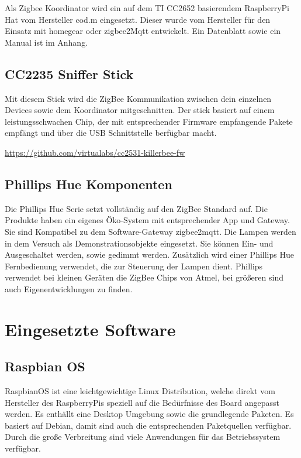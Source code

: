 Als Zigbee Koordinator wird ein auf dem TI CC2652 basierendem RaspberryPi Hat vom Hersteller \grqq cod.m \grqq{} eingesetzt. Dieser wurde vom Hersteller
für den Einsatz mit \grqq homegear \grqq{} oder \grqq zigbee2Mqtt \grqq{} entwickelt. Ein Datenblatt sowie ein Manual ist im Anhang.

\subsection{CC2235 Sniffer Stick}

Mit diesem Stick wird die ZigBee Kommunikation zwischen dein einzelnen Devices sowie dem Koordinator mitgeschnitten.
Der stick basiert auf einem leistungsschwachen Chip, der mit entsprechender Firmware empfangende Pakete empfängt und über die USB Schnittstelle
berfügbar macht. 

\url{https://github.com/virtualabs/cc2531-killerbee-fw}

\subsection{Phillips Hue Komponenten}

Die Phillips Hue Serie setzt vollständig auf den ZigBee Standard auf. Die Produkte haben ein eigenes Öko-System mit entsprechender App und Gateway. Sie sind Kompatibel
zu dem Software-Gateway zigbee2mqtt.
Die Lampen werden in dem Versuch als Demonstrationsobjekte eingesetzt. Sie können Ein- und Ausgeschaltet werden, sowie gedimmt werden. Zusätzlich wird einer
Phillips Hue Fernbedienung verwendet, die zur Steuerung der Lampen dient. Phillips verwendet bei kleinen Geräten die ZigBee Chips von Atmel, bei größeren 
sind auch Eigenentwicklungen zu finden.

\section{Eingesetzte Software}

\subsection{Raspbian OS}

RaspbianOS ist eine leichtgewichtige Linux Distribution, welche direkt vom Hersteller des RaspberryPis speziell auf die Bedürfnisse des Board angepasst werden. Es enthällt eine
Desktop Umgebung sowie die grundlegende Paketen. Es basiert auf Debian, damit sind auch die entsprechenden Paketquellen verfügbar. Durch die große Verbreitung 
sind viele Anwendungen für das Betriebssystem verfügbar.

